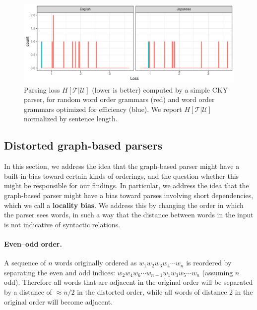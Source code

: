 \documentclass[10pt,twoside,lineno]{article}
\newcommand{\key}[1]{\textbf{#1}}
\newcommand{\utterance}{\mathcal{U}}
\newcommand{\tree}{\mathcal{T}}
\begin{document}
\begin{figure}
    \centering
    \includegraphics[scale=.7]{../results/cky/cky-parse.pdf} 
	\caption{Parsing loss $H[\tree|\utterance]$ (lower is better) computed by a simple CKY parser, for random word order grammars (red) and word order grammars optimized for efficiency (blue). We report $H[\tree|\utterance]$ normalized by sentence length.}
    \label{fig:cky-parser}
\end{figure}



\subsection{Distorted graph-based parsers}

In this section, we address the idea that the graph-based parser might have a built-in bias toward certain kinds of orderings, and the question whether this might be responsible for our findings.
In particular, we address the idea that the graph-based parser might have a bias toward parses involving short dependencies, which we call a \key{locality bias}. 
We address this by changing the order in which the parser sees words, in such a way that the distance between words in the input is not indicative of syntactic relations.




\paragraph{Even--odd order.} A sequence of $n$ words originally ordered as $w_1 w_2 w_3 w_4 \cdots w_n$ is reordered by separating the even and odd indices: $w_2 w_4 w_6 \cdots w_{n-1} w_1 w_3 w_5 \cdots w_n$ (assuming $n$ odd). Therefore all words that are adjacent in the original order will be separated by a distance of $\approx n/2$ in the distorted order, while all words of distance 2 in the original order will become adjacent.
\end{document}
